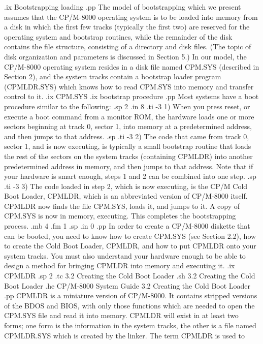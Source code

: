 .ix Bootstrapping loading
.pp
The model of bootstrapping which we present assumes that the CP/M-8000 
operating system is to be loaded into memory from a disk in which the first 
few tracks (typically the first two) are reserved for the operating system 
and bootstrap routines, while the remainder of the disk contains the file 
structure, consisting of a directory and disk files.  (The topic of disk 
organization and parameters is discussed in Section 5.)  In our model, 
the CP/M-8000 operating system resides in a disk file named CPM.SYS (described 
in Section 2), and the system tracks contain a bootstrap loader program 
(CPMLDR.SYS) which knows how to read CPM.SYS into memory and transfer 
control to it.
.ix CPM.SYS
.ix bootstrap procedure
.pp
Most systems have a boot procedure similar to the following:
.sp 2
.in 8
.ti -3
1) When you press reset, or execute a boot command from a monitor ROM,
the hardware loads one or more sectors beginning at track 0, sector 1, into
memory at a predetermined address, and then jumps to that address.
.sp
.ti -3
2) The code that came from track 0, sector 1, and is now executing, is 
typically a small bootstrap routine that loads the rest of the sectors on the
system tracks (containing CPMLDR) into another predetermined address in 
memory, and then jumps to that address.  Note that if your hardware is 
smart enough, steps 1 and 2 can be combined into one step.
.sp
.ti -3
3) The code loaded in step 2, which is now executing, is the CP/M Cold Boot
Loader, CPMLDR, which is an abbreviated version of CP/M-8000 itself.  CPMLDR
now finds the file CPM.SYS, loads it, and jumps to it.  A copy of CPM.SYS is
now in memory, executing.  This completes the bootstrapping process.  
.mb 4
.fm 1
.sp
.in 0
.pp
In order to create a CP/M-8000 diskette that can be booted, you need to know
how to create CPM.SYS (see Section 2.2),  how to create the Cold Boot Loader, 
CPMLDR, and how to put CPMLDR onto your system tracks.  You must also 
understand your hardware enough to be able to design a method for bringing
CPMLDR into memory and executing it.
.ix CPMLDR
.sp 2
.tc    3.2  Creating the Cold Boot Loader
.sh
3.2  Creating the Cold Boot Loader
.he CP/M-8000 System Guide          3.2  Creating the Cold Boot Loader
.pp
CPMLDR is a miniature version of CP/M-8000.  It contains stripped versions of
the BDOS and BIOS, with only those functions which are needed to open the 
CPM.SYS file and read it into memory.  CPMLDR will exist in at least two forms;
one form is the information in the system tracks, the other is a file named 
CPMLDR.SYS which is created by the linker.  The term CPMLDR is used to
